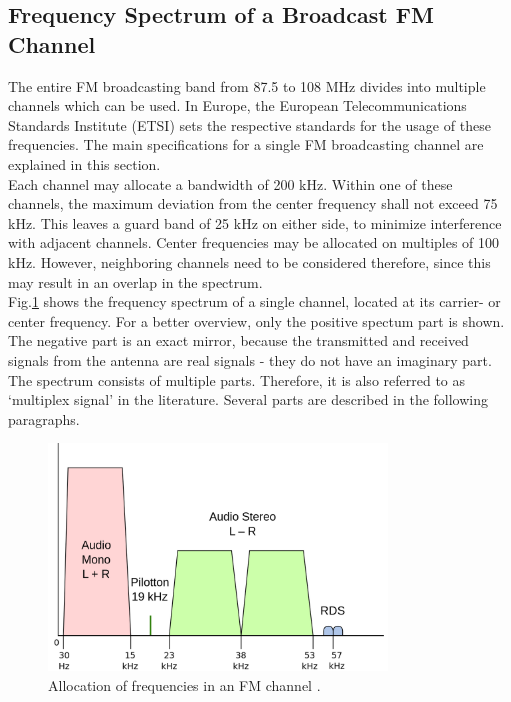 

\subsection{Frequency Spectrum of a Broadcast FM Channel}

The entire FM broadcasting band from 87.5 to 108 MHz divides into multiple channels which can be used.
In Europe, the European Telecommunications Standards Institute (ETSI) sets the respective standards for the usage of these frequencies.
The main specifications for a single FM broadcasting channel are explained in this section.\\

Each channel may allocate a bandwidth of 200 kHz.
Within one of these channels, the maximum deviation from the center frequency shall not exceed 75 kHz.
This leaves a guard band of 25 kHz on either side, to minimize interference with adjacent channels.
Center frequencies may be allocated on multiples of 100 kHz.
However, neighboring channels need to be considered therefore, since this may result in an overlap in the spectrum.\\

Fig.\ref{fig_channel_baseband_freqs} shows the frequency spectrum of a single channel, located at its carrier- or center frequency.
For a better overview, only the positive spectum part is shown.
The negative part is an exact mirror, because the transmitted and received signals from the antenna are real signals - they do not have an imaginary part.
The spectrum consists of multiple parts. Therefore, it is also referred to as `multiplex signal' in the literature. Several parts are described in the following paragraphs.

\begin{figure}[!h]
  \centering
    \includegraphics[width=9cm]{img/fm-channel-baseband.png}
  \caption{Allocation of frequencies in an FM channel \cite{ref_fig_channel_freqs}.}
  \label{fig_channel_baseband_freqs}
\end{figure}

